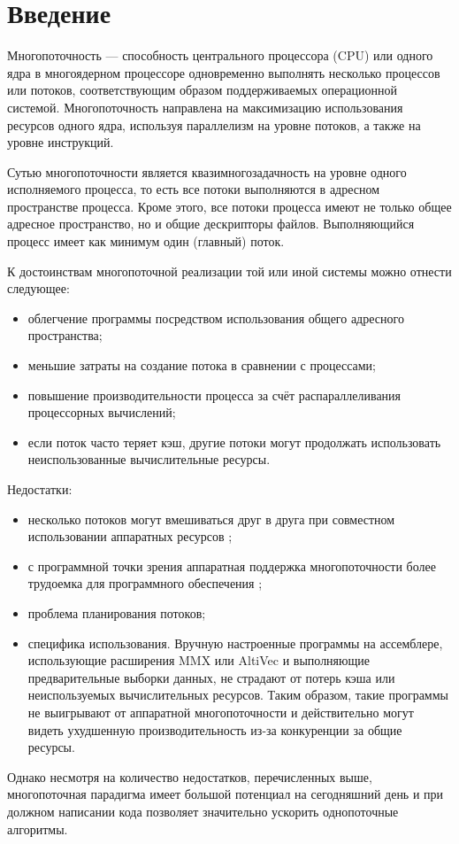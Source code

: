 \chapter*{Введение}

Многопоточность — способность центрального процессора (CPU) или одного ядра в многоядерном процессоре одновременно выполнять несколько процессов или потоков, соответствующим образом поддерживаемых операционной системой. Многопоточность направлена на максимизацию использования ресурсов одного ядра, используя параллелизм на уровне потоков, а также на уровне инструкций.

Сутью многопоточности является квазимногозадачность на уровне одного исполняемого процесса, то есть все потоки выполняются в адресном пространстве процесса. Кроме этого, все потоки процесса имеют не только общее адресное пространство, но и общие дескрипторы файлов. Выполняющийся процесс имеет как минимум один (главный) поток.


К достоинствам многопоточной реализации той или иной системы можно отнести следующее:
\begin{itemize}
	\item облегчение программы посредством использования общего адресного пространства;
	\item меньшие затраты на создание потока в сравнении с процессами;
	\item повышение производительности процесса за счёт распараллеливания процессорных вычислений;
	\item если поток часто теряет кэш, другие потоки могут продолжать использовать неиспользованные вычислительные ресурсы.
\end{itemize}

Недостатки:
\begin{itemize}
	\item несколько потоков могут вмешиваться друг в друга при совместном использовании аппаратных ресурсов \cite{Nemirovsky};
	\item с программной точки зрения аппаратная поддержка многопоточности более трудоемка для программного обеспечения \cite{Olukotun};
	\item проблема планирования потоков;
	\item специфика использования. Вручную настроенные программы на ассемблере, использующие расширения MMX или AltiVec и выполняющие предварительные выборки данных, не страдают от потерь кэша или неиспользуемых вычислительных ресурсов. Таким образом, такие программы не выигрывают от аппаратной многопоточности и действительно могут видеть ухудшенную производительность из-за конкуренции за общие ресурсы.
\end{itemize}
Однако несмотря на количество недостатков, перечисленных выше, многопоточная парадигма имеет большой потенциал на сегодняшний день и при должном написании кода позволяет значительно ускорить однопоточные алгоритмы.

